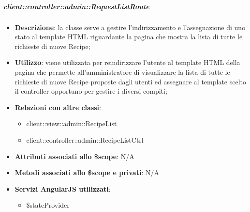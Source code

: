 		\subparagraph{client::controller::admin::RequestListRoute} %
		\label{subp:bdsm_app_client_controller_admin_recipelistroute}

			\begin{itemize}
				\item \textbf{Descrizione}: la classe serve a gestire l'indirizzamento e l'assegnazione di uno stato al template HTML riguardante la pagina che mostra la lista di tutte le richieste di nuove Recipe;
				\item \textbf{Utilizzo}: viene utilizzata per reindirizzare l'utente al template HTML della pagina che permette all'amministratore di visualizzare la lista di tutte le richieste di nuove Recipe proposte dagli utenti ed assegnare al template scelto il controller opportuno per gestire i diversi compiti;
				\item \textbf{Relazioni con altre classi}:
					\begin{itemize}
						\item client::view::admin::RecipeList
						\item client::controller::admin::RecipeListCtrl
					\end{itemize}
				\item \textbf{Attributi associati allo \$scope}: N/A
				\item \textbf{Metodi associati allo \$scope e privati}: N/A
				\item \textbf{Servizi AngularJS utilizzati}:
					\begin{itemize}
						\item \$stateProvider
					\end{itemize}
			\end{itemize}


